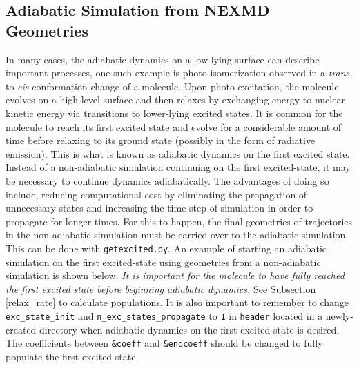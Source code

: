 \documentclass[letterpaper,12pt,titlepage]{article}
\begin{document}
\subsection{Adiabatic Simulation from NEXMD Geometries}
In many cases, the adiabatic dynamics on a low-lying surface can describe important processes, one such example is photo-isomerization observed in a \textit{trans}-to-\textit{cis} conformation change of a molecule.  Upon photo-excitation, the molecule evolves on a high-level surface and then relaxes by exchanging energy to nuclear kinetic energy via transitions to lower-lying excited states.  It is common for the molecule to reach its first excited state and evolve for a considerable amount of time before relaxing to its ground state (possibly in the form of radiative emission).  This is what is known as adiabatic dynamics on the first excited state.  Instead of a non-adiabatic simulation continuing on the first excited-state, it may be necessary to continue dynamics adiabatically.  The advantages of doing so include, reducing computational cost by eliminating the propagation of unnecessary states and increasing the time-step of simulation in order to propagate for longer times.  For this to happen, the final geometries of trajectories in the non-adiabatic simulation must be carried over to the adiabatic simulation.  This can be done with \verb+getexcited.py+.  An example of starting an adiabatic simulation on the first excited-state using geometries from a non-adiabatic simulation is shown below.  \textit{It is important for the molecule to have fully reached the first excited state before beginning adiabatic dynamics.}  See Subsection \ref{relax_rate} to calculate populations.  It is also important to remember to change \verb+exc_state_init+ and \verb+n_exc_states_propagate+ to \verb+1+ in \verb+header+ located in a newly-created directory when adiabatic dynamics on the first excited-state is desired.  The coefficients between \verb+&coeff+ and \verb+&endcoeff+ should be changed to fully populate the first excited state.
\end{document}
